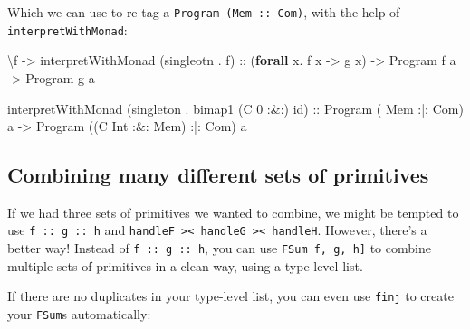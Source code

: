 \documentclass[]{article}
\newenvironment{Shaded}{}{}
\newcommand{\DataTypeTok}[1]{\textcolor[rgb]{0.56,0.13,0.00}{#1}}
\newcommand{\DecValTok}[1]{\textcolor[rgb]{0.25,0.63,0.44}{#1}}
\newcommand{\FunctionTok}[1]{\textcolor[rgb]{0.02,0.16,0.49}{#1}}
\newcommand{\KeywordTok}[1]{\textcolor[rgb]{0.00,0.44,0.13}{\textbf{#1}}}
\newcommand{\NormalTok}[1]{#1}
\newcommand{\OperatorTok}[1]{\textcolor[rgb]{0.40,0.40,0.40}{#1}}
\newcommand{\OtherTok}[1]{\textcolor[rgb]{0.00,0.44,0.13}{#1}}
\begin{document}
Which we can use to re-tag a \texttt{Program\ (Mem\ :\textbar{}:\ Com)}, with
the help of \texttt{interpretWithMonad}:

\begin{Shaded}
\begin{Highlighting}[]
\NormalTok{\textbackslash{}f }\OtherTok{{-}\textgreater{}}\NormalTok{ interpretWithMonad (singleotn }\OperatorTok{.}\NormalTok{ f)}
\OtherTok{    ::}\NormalTok{ (}\KeywordTok{forall}\NormalTok{ x}\OperatorTok{.}\NormalTok{ f x }\OtherTok{{-}\textgreater{}}\NormalTok{ g x)}
    \OtherTok{{-}\textgreater{}} \DataTypeTok{Program}\NormalTok{ f a}
    \OtherTok{{-}\textgreater{}} \DataTypeTok{Program}\NormalTok{ g a}

\NormalTok{interpretWithMonad (singleton }\OperatorTok{.}\NormalTok{ bimap1 (}\DataTypeTok{C} \DecValTok{0} \OperatorTok{:\&:}\NormalTok{) }\FunctionTok{id}\NormalTok{)}
\OtherTok{    ::} \DataTypeTok{Program}\NormalTok{ (      }\DataTypeTok{Mem}       \OperatorTok{:|:} \DataTypeTok{Com}\NormalTok{) a}
    \OtherTok{{-}\textgreater{}} \DataTypeTok{Program}\NormalTok{ ((}\DataTypeTok{C} \DataTypeTok{Int} \OperatorTok{:\&:} \DataTypeTok{Mem}\NormalTok{) }\OperatorTok{:|:} \DataTypeTok{Com}\NormalTok{) a}
\end{Highlighting}
\end{Shaded}

\subsection{Combining many different sets of
primitives}\label{combining-many-different-sets-of-primitives}

If we had three sets of primitives we wanted to combine, we might be tempted to
use \texttt{f\ :\textbar{}:\ g\ :\textbar{}:\ h} and
\texttt{handleF\ \textgreater{}\textbar{}\textless{}\ handleG\ \textgreater{}\textbar{}\textless{}\ handleH}.
However, there's a better way! Instead of
\texttt{f\ :\textbar{}:\ g\ :\textbar{}:\ h}, you can use
\texttt{FSum\ \textquotesingle{}{[}f,\ g,\ h{]}} to combine multiple sets of
primitives in a clean way, using a type-level list.

If there are no duplicates in your type-level list, you can even use
\texttt{finj} to create your \texttt{FSum}s automatically:
\end{document}
